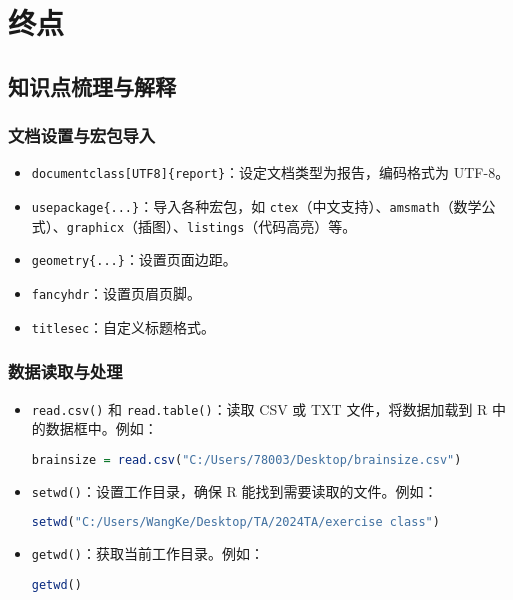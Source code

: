 \documentclass[UTF8]{report}
\theoremstyle{MyLineTheoremStyle} %
\theoremstyle{MyBlockTheoremStyle} %
\theoremstyle{MySubsubsectionStyle} %
\begin{document}
\chapter{终点}

\section*{知识点梳理与解释}

\subsection*{文档设置与宏包导入}

\begin{itemize}
    \item \texttt{documentclass[UTF8]\{report\}}：设定文档类型为报告，编码格式为 UTF-8。
    \item \texttt{usepackage\{...\}}：导入各种宏包，如 \texttt{ctex}（中文支持）、\texttt{amsmath}（数学公式）、\texttt{graphicx}（插图）、\texttt{listings}（代码高亮）等。
    \item \texttt{geometry\{...\}}：设置页面边距。
    \item \texttt{fancyhdr}：设置页眉页脚。
    \item \texttt{titlesec}：自定义标题格式。
\end{itemize}

\subsection*{数据读取与处理}

\begin{itemize}
    \item \texttt{read.csv()} 和 \texttt{read.table()}：读取 CSV 或 TXT 文件，将数据加载到 R 中的数据框中。例如：
    \begin{lstlisting}[language=R]
    brainsize = read.csv("C:/Users/78003/Desktop/brainsize.csv")
    \end{lstlisting}
    \item \texttt{setwd()}：设置工作目录，确保 R 能找到需要读取的文件。例如：
    \begin{lstlisting}[language=R]
    setwd("C:/Users/WangKe/Desktop/TA/2024TA/exercise class")
    \end{lstlisting}
    \item \texttt{getwd()}：获取当前工作目录。例如：
    \begin{lstlisting}[language=R]
    getwd()
    \end{lstlisting}
\end{itemize}
\end{document}
